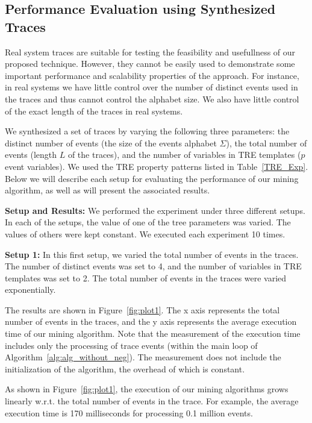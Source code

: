 \documentclass[]{sigplanconf}
\begin{document}
\subsection{Performance Evaluation using Synthesized Traces}

Real system traces are suitable for testing the feasibility and usefullness of our proposed technique. However, they cannot be easily used to demonstrate some important performance and scalability properties of the approach. For instance, in real systems we have little control over the number of distinct events used in the traces and thus cannot control the alphabet size. We also have little control of the exact length of the traces in real systems.


We synthesized a set of traces by varying the following three parameters: the distinct number of events (the size of the events alphabet $\Sigma$), the total number of events (length $L$ of the traces), and the number of variables in TRE templates ($p$ event variables). We used the TRE property patterns listed in Table~\ref{TRE_Exp}.
Below we will describe each setup for evaluating the performance of our mining algorithm, as well as will present the associated results.

\vspace{3mm}

\noindent \textbf{Setup and Results:} We performed the experiment under three different setups. In each of the setups, the value of one of the tree parameters was varied. The values of others were kept constant. We executed each experiment 10 times.


\vspace{3mm}

\noindent \textbf{Setup 1:}
In this first setup, we varied the total number of events in the traces. The number of distinct events was set to 4, and the number of variables in TRE templates was set to 2. The total number of events in the traces were varied exponentially.

The results are shown in Figure~\ref{fig:plot1}. The x axis represents the total number of events in the traces, and the y axis represents the average execution time of our mining algorithm. Note that the measurement of the execution time includes only the processing of trace events (within the main loop of Algorithm~\ref{alg:alg_without_neg}). The measurement does not include the initialization of the algorithm, the overhead of which is constant.

As shown in Figure~\ref{fig:plot1}, the execution of our mining algorithms grows linearly w.r.t. the total number of events in the trace. For example, the average execution time is 170 milliseconds for processing 0.1 million events.
\end{document}
